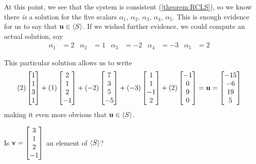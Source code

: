 \documentclass{ximera}
\begin{document}
\begin{example}
\begin{question}
\begin{feedback}[correct]
      At this point, we see that the system is consistent
      (\ref{theorem:RCLS}), so we know there \textit{is} a solution for
      the five scalars
      $\alpha_1,\,\alpha_2,\,\alpha_3,\,\alpha_4,\,\alpha_5$.  This is
      enough evidence for us to say that $\mathbf{u}\in\left\langle S\right\rangle$.  If we
      wished further evidence, we could compute an actual solution, say
      \begin{align*}
        \alpha_1&=2
        &
          \alpha_2&=1
        &
          \alpha_3&=-2
        &
          \alpha_4&=-3
        &
          \alpha_5&=2
      \end{align*}
      
      This particular solution allows us to write
      \[
        (2)\begin{bmatrix}1 \\ 1 \\ 3 \\ 1\end{bmatrix}+
        (1)\begin{bmatrix}2 \\ 1 \\ 2 \\ -1\end{bmatrix}+
        (-2)\begin{bmatrix}7 \\ 3 \\ 5 \\ -5\end{bmatrix}+
        (-3)\begin{bmatrix}1 \\ 1 \\ -1 \\ 2\end{bmatrix}+
        (2)\begin{bmatrix}-1 \\ 0 \\ 9 \\ 0\end{bmatrix}
        =\mathbf{u}
        =\begin{bmatrix}-15\\-6\\19\\5\end{bmatrix}
      \]
      making it even more obvious that $\mathbf{u}\in\left\langle S\right\rangle$.
    \end{feedback}
  \end{question}
  
  \begin{question}
    Is $\mathbf{v}=\begin{bmatrix}3\\1\\2\\-1\end{bmatrix}$ an element of $\left\langle S\right\rangle$?


\end{question}
\end{example}
\end{document}
